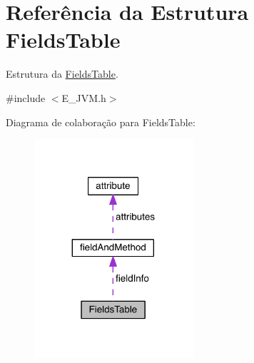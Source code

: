 \hypertarget{struct_fields_table}{}\section{Referência da Estrutura Fields\+Table}
\label{struct_fields_table}


Estrutura da \hyperlink{struct_fields_table}{Fields\+Table}.  




{\ttfamily \#include $<$E\+\_\+\+J\+V\+M.\+h$>$}



Diagrama de colaboração para Fields\+Table\+:\nopagebreak
\begin{figure}[H]
\begin{center}
\leavevmode
\includegraphics[width=167pt]{struct_fields_table__coll__graph}
\end{center}
\end{figure}
